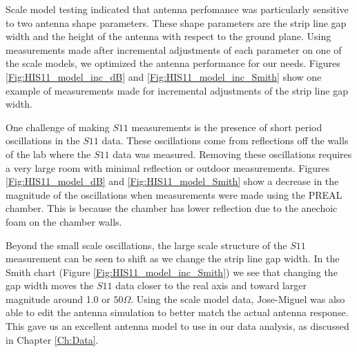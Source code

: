 Scale model testing indicated that antenna perfomance was particularly sensitive to two antenna shape parameters. These shape parameters are the strip line gap width and the height of the antenna with respect to the ground plane. Using measurements made after incremental adjustments of each parameter on one of the scale models, we optimized the antenna performance for our needs. Figures \ref{Fig:HIS11_model_inc_dB} and \ref{Fig:HIS11_model_inc_Smith} show one example of measurements made for incremental adjustments of the strip line gap width. 

One challenge of making $S11$ measurements is the presence of short period oscillations in the $S11$ data. These oscillations come from reflections off the walls of the lab where the $S11$ data was measured. Removing these oscillations requires a very large room with minimal reflection or outdoor measurements. Figures \ref{Fig:HIS11_model_dB} and \ref{Fig:HIS11_model_Smith} show a decrease in the magnitude of the oscillations when measurements were made using the PREAL chamber. This is because the chamber has lower reflection due to the anechoic foam on the chamber walls. 

Beyond the small scale oscillations, the large scale structure of the $S11$ measurement can be seen to shift as we change the strip line gap width. In the Smith chart (Figure \ref{Fig:HIS11_model_inc_Smith}) we see that changing the gap width moves the $S11$ data closer to the real axis and toward larger magnitude around 1.0 or $50 \Omega$. Using the scale model data, Jose-Miguel was also able to edit the antenna simulation to better match the actual antenna response. This gave us an excellent antenna model to use in our data analysis, as discussed in Chapter \ref{Ch:Data}. 

